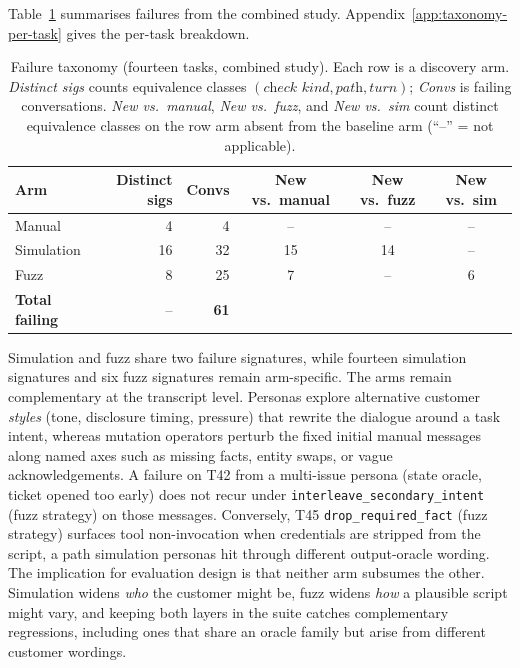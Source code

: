 Table~\ref{tab:failure-taxonomy} summarises failures from the combined study. Appendix~\ref{app:taxonomy-per-task} gives the per-task breakdown.

\begin{table}[htbp]
\centering
\caption{Failure taxonomy (fourteen tasks, combined study). Each row is a discovery arm. \emph{Distinct sigs} counts equivalence classes $(\textit{check kind}, \textit{path}, \textit{turn})$; \emph{Convs} is failing conversations. \emph{New vs.\ manual}, \emph{New vs.\ fuzz}, and \emph{New vs.\ sim} count distinct equivalence classes on the row arm absent from the baseline arm (``--'' = not applicable).}
\label{tab:failure-taxonomy}
\small
\begin{tabular}{@{}lrrccc@{}}
\toprule
Arm & Distinct sigs & Convs & New vs.\ manual & New vs.\ fuzz & New vs.\ sim \\
\midrule
Manual & 4 & 4 & -- & -- & -- \\
Simulation & 16 & 32 & 15 & 14 & -- \\
Fuzz & 8 & 25 & 7 & -- & 6 \\
\midrule
\textbf{Total failing} & -- & \textbf{61} & & & \\
\bottomrule
\end{tabular}
\end{table}

Simulation and fuzz share two failure signatures, while fourteen simulation signatures and six fuzz signatures remain arm-specific. The arms remain complementary at the transcript level. Personas explore alternative customer \emph{styles} (tone, disclosure timing, pressure) that rewrite the dialogue around a task intent, whereas mutation operators perturb the fixed initial manual messages along named axes such as missing facts, entity swaps, or vague acknowledgements. A failure on T42 from a multi-issue persona (state oracle, ticket opened too early) does not recur under \texttt{interleave\_secondary\_intent} (fuzz strategy) on those messages. Conversely, T45 \texttt{drop\_required\_fact} (fuzz strategy) surfaces tool non-invocation when credentials are stripped from the script, a path simulation personas hit through different output-oracle wording. The implication for evaluation design is that neither arm subsumes the other. Simulation widens \emph{who} the customer might be, fuzz widens \emph{how} a plausible script might vary, and keeping both layers in the suite catches complementary regressions, including ones that share an oracle family but arise from different customer wordings.

